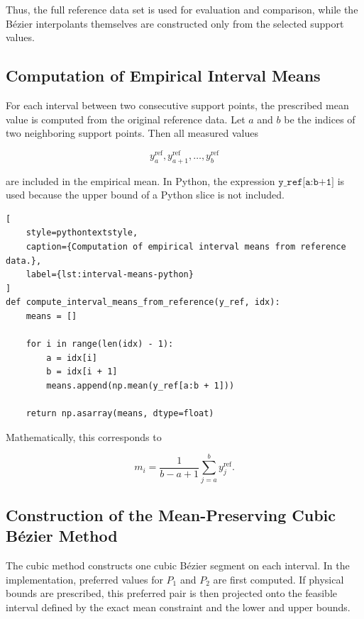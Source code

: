 \documentclass[12pt,a4paper]{article}
\begin{document}
Thus, the full reference data set is used for evaluation and comparison,
while the B\'ezier interpolants themselves are constructed only from the
selected support values.

\subsection{Computation of Empirical Interval Means}

For each interval between two consecutive support points, the prescribed mean
value is computed from the original reference data. Let \(a\) and \(b\) be
the indices of two neighboring support points. Then all measured values

\[
y_a^{\mathrm{ref}},y_{a+1}^{\mathrm{ref}},\dots,y_b^{\mathrm{ref}}
\]

are included in the empirical mean. In Python, the expression
\(\texttt{y\_ref[a:b+1]}\) is used because the upper bound of a Python slice is
not included.

\begin{lstlisting}[
    style=pythontextstyle,
    caption={Computation of empirical interval means from reference data.},
    label={lst:interval-means-python}
]
def compute_interval_means_from_reference(y_ref, idx):
    means = []

    for i in range(len(idx) - 1):
        a = idx[i]
        b = idx[i + 1]
        means.append(np.mean(y_ref[a:b + 1]))

    return np.asarray(means, dtype=float)
\end{lstlisting}

Mathematically, this corresponds to

\[
m_i =
\frac{1}{b-a+1}
\sum_{j=a}^{b} y_j^{\mathrm{ref}}.
\]

\subsection{Construction of the Mean-Preserving Cubic B\'ezier Method}

The cubic method constructs one cubic B\'ezier segment on each interval.
In the implementation, preferred values for \(P_1\) and \(P_2\) are first computed. If physical bounds are prescribed, this preferred pair is then projected onto the feasible interval defined by the exact mean constraint and the lower and upper bounds.
\end{document}
